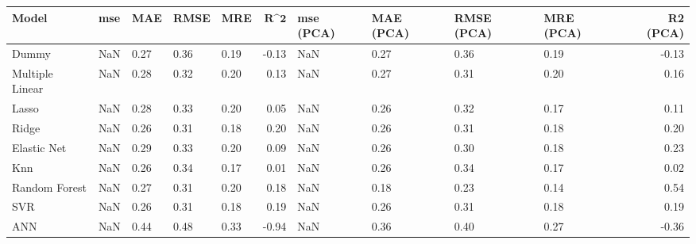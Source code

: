 \begin{table}
\centering
\label{table:iri_reg_pred}
\begin{tabular}{lllllrllllr}
\toprule
 \textbf{Model} & \textbf{mse} & \textbf{MAE} & \textbf{RMSE} & \textbf{MRE} & $\textbf{R^2}$ & \textbf{mse (PCA)} & \textbf{MAE (PCA)} & \textbf{RMSE (PCA)} & \textbf{MRE (PCA)} & \textbf{R2 (PCA)} \\
\midrule
          Dummy &          NaN &         0.27 &          0.36 &         0.19 &          -0.13 &                NaN &               0.27 &                0.36 &               0.19 &             -0.13 \\
Multiple Linear &          NaN &         0.28 &          0.32 &         0.20 &           0.13 &                NaN &               0.27 &                0.31 &               0.20 &              0.16 \\
          Lasso &          NaN &         0.28 &          0.33 &         0.20 &           0.05 &                NaN &               0.26 &                0.32 &               0.17 &              0.11 \\
          Ridge &          NaN &         0.26 &          0.31 &         0.18 &           0.20 &                NaN &               0.26 &                0.31 &               0.18 &              0.20 \\
    Elastic Net &          NaN &         0.29 &          0.33 &         0.20 &           0.09 &                NaN &               0.26 &                0.30 &               0.18 &              0.23 \\
            Knn &          NaN &         0.26 &          0.34 &         0.17 &           0.01 &                NaN &               0.26 &                0.34 &               0.17 &              0.02 \\
  Random Forest &          NaN &         0.27 &          0.31 &         0.20 &           0.18 &                NaN &               0.18 &                0.23 &               0.14 &              0.54 \\
            SVR &          NaN &         0.26 &          0.31 &         0.18 &           0.19 &                NaN &               0.26 &                0.31 &               0.18 &              0.19 \\
            ANN &          NaN &         0.44 &          0.48 &         0.33 &          -0.94 &                NaN &               0.36 &                0.40 &               0.27 &             -0.36 \\
\bottomrule
\end{tabular}
\end{table}
